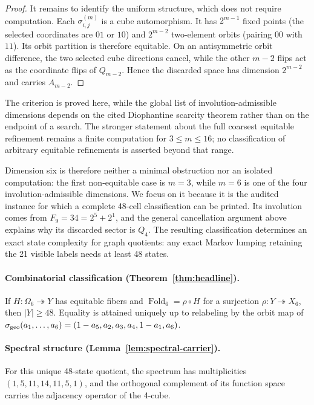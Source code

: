 \documentclass[12pt,a4paper]{article}
\theoremstyle{plain}
\theoremstyle{definition}
\numberwithin{equation}{section}
\newcommand{\Fold}{\operatorname{Fold}}
\newcommand{\card}[1]{\lvert #1\rvert}
\begin{document}
\begin{proof}
It remains to identify the uniform structure, which does not require computation.
Each \(\sigma_{i,j}^{(m)}\) is a cube automorphism.  It has \(2^{m-1}\) fixed points
(the selected coordinates are \(01\) or \(10\)) and \(2^{m-2}\) two-element orbits
(pairing \(00\) with \(11\)).  Its orbit partition is therefore equitable.  On an
antisymmetric orbit difference, the two selected cube directions cancel, while the
other \(m-2\) flips act as the coordinate flips of \(Q_{m-2}\).  Hence the discarded
space has dimension \(2^{m-2}\) and carries \(A_{m-2}\).
\end{proof}

The criterion is proved here, while the global list of involution-admissible dimensions
depends on the cited Diophantine scarcity theorem rather than on the endpoint of a
search.  The stronger statement about the full coarsest equitable refinement remains a finite
computation for \(3\le m\le16\); no classification of arbitrary equitable refinements is
asserted beyond that range.

Dimension six is therefore neither a minimal obstruction nor an isolated computation:
the first non-equitable case is \(m=3\), while \(m=6\) is one of the four
involution-admissible dimensions.  We focus on it because it is the audited
instance for which a complete 48-cell classification can be printed.  Its involution
comes from \(F_9=34=2^5+2^1\), and the general cancellation argument above explains
why its discarded sector is \(Q_4\).  The resulting classification determines an exact
state complexity for graph quotients: any exact Markov lumping retaining the 21 visible
labels needs at least 48 states.

\paragraph{Combinatorial classification (Theorem~\ref{thm:headline}).}
If \(H:\Omega_6\twoheadrightarrow Y\) has equitable fibers and
\(\Fold_6=\rho\circ H\) for a surjection \(\rho:Y\twoheadrightarrow X_6\), then
\(\card{Y}\ge48\).  Equality is attained uniquely up to relabeling by the orbit map
of \(\sigma_{\rm geo}(a_1,\ldots,a_6)=(1-a_5,a_2,a_3,a_4,1-a_1,a_6)\).

\paragraph{Spectral structure (Lemma~\ref{lem:spectral-carrier}).}
For this unique 48-state quotient, the spectrum has multiplicities
\((1,5,11,14,11,5,1)\), and the orthogonal complement of its function space carries
the adjacency operator of the 4-cube.
\end{document}
